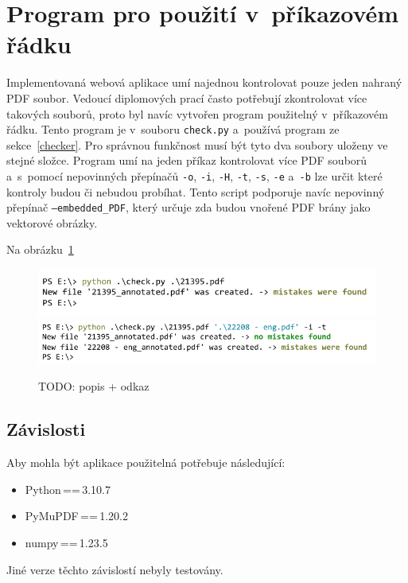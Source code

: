 \section{Program pro použití v~příkazovém řádku}

Implementovaná webová aplikace umí najednou kontrolovat pouze jeden nahraný PDF
soubor. Vedoucí diplomových prací často potřebují zkontrolovat více takových
souborů, proto byl navíc vytvořen program použitelný v~příkazovém řádku. 
Tento program je v~souboru \texttt{check.py} a~používá program ze
sekce~\ref{checker}. Pro správnou funkčnost musí být tyto dva soubory uloženy ve
stejné složce. Program umí na jeden příkaz kontrolovat více PDF souborů
a~s~pomocí nepovinných přepínačů \texttt{-o}, \texttt{-i}, \texttt{-H}, 
\texttt{-t}, \texttt{-s}, \texttt{-e} a~\texttt{-b} lze určit které kontroly
budou či nebudou probíhat. Tento script podporuje navíc nepovinný přepínač
\texttt{--embedded\_PDF}, který určuje zda budou vnořené PDF brány jako
vektorové obrázky.

Na obrázku~\ref{pic_theses_checker_cmd}

\begin{figure}[H]
    \centering
    \includegraphics[]{obrazky-figures/cmd_screenshot_one.pdf}
    \includegraphics[]{obrazky-figures/cmd_screenshot_many.pdf}
    \caption{TODO: popis + odkaz}
    \label{pic_theses_checker_cmd}
\end{figure}


\subsection*{Závislosti}
Aby mohla být aplikace použitelná potřebuje následující:
\begin{itemize}
    \item Python\,==\,3.10.7
    \item PyMuPDF\,==\,1.20.2
    \item numpy\,==\,1.23.5
\end{itemize}
Jiné verze těchto závislostí nebyly testovány.



